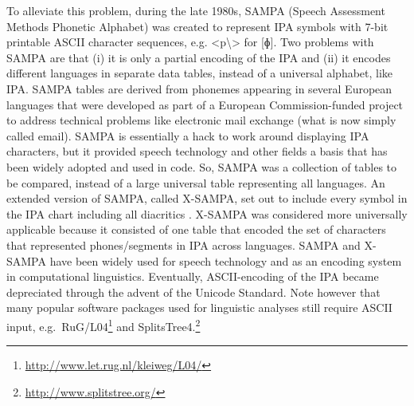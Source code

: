 To alleviate this problem, during the late 1980s, SAMPA (Speech Assessment Methods Phonetic Alphabet) was created to represent IPA symbols with 7-bit printable ASCII character sequences, e.g. <p\textbackslash> for [ɸ]. Two problems with SAMPA are that (i) it is only a partial encoding of the IPA and (ii) it encodes different languages in separate data tables, instead of a universal alphabet, like IPA. SAMPA tables are derived from phonemes appearing in several European languages that were developed as part of a European Commission-funded project to address technical problems like electronic mail exchange (what is now simply called email). SAMPA is essentially a hack to work around displaying IPA characters, but it provided speech technology and other fields a basis that has been widely adopted and used in code. So, SAMPA was a collection of tables to be compared, instead of a large universal table representing all languages. An extended version of SAMPA, called X-SAMPA, set out to include every symbol in the IPA chart including all diacritics \citep{WellsND}. X-SAMPA was considered more universally applicable because it consisted of one table that encoded the set of characters that represented phones/segments in IPA across languages. SAMPA and X-SAMPA have been widely used for speech technology and as an encoding system in computational linguistics. Eventually, ASCII-encoding of the IPA became depreciated through the advent of the Unicode Standard. Note however that many popular software packages used for linguistic analyses still require ASCII input, e.g.~RuG/L04\footnote{\url{http://www.let.rug.nl/kleiweg/L04/}} and SplitsTree4.\footnote{\url{http://www.splitstree.org/}}

